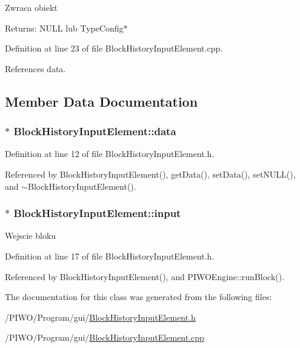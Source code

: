 Zwraca obiekt \begin{Desc}
\item[Returns:]NULL lub TypeConfig$\ast$ \end{Desc}


Definition at line 23 of file BlockHistoryInputElement.cpp.

References data.

\subsection{Member Data Documentation}
\hypertarget{classBlockHistoryInputElement_e8c6facba5335a07f2452279191cd6e8}{
\subsubsection[data]{$\ast$ {\bf BlockHistoryInputElement::data}}}
\label{classBlockHistoryInputElement_e8c6facba5335a07f2452279191cd6e8}




Definition at line 12 of file BlockHistoryInputElement.h.

Referenced by BlockHistoryInputElement(), getData(), setData(), setNULL(), and $\sim$BlockHistoryInputElement().\hypertarget{classBlockHistoryInputElement_5a307d34d5e47b9baf161c7069415c93}{
\subsubsection[input]{$\ast$ {\bf BlockHistoryInputElement::input}}}
\label{classBlockHistoryInputElement_5a307d34d5e47b9baf161c7069415c93}


Wejscie bloku 

Definition at line 17 of file BlockHistoryInputElement.h.

Referenced by BlockHistoryInputElement(), and PIWOEngine::runBlock().

The documentation for this class was generated from the following files:\begin{CompactItemize}
\item 
/PIWO/Program/gui/\hyperlink{BlockHistoryInputElement_8h}{BlockHistoryInputElement.h}\item 
/PIWO/Program/gui/\hyperlink{BlockHistoryInputElement_8cpp}{BlockHistoryInputElement.cpp}\end{CompactItemize}
